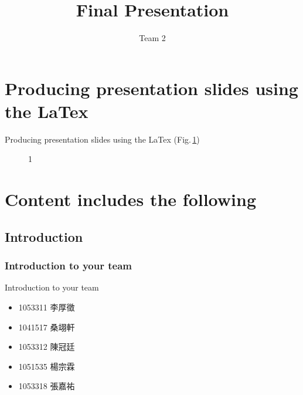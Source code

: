 \documentclass{beamer}
\title{Final Presentation}
\subtitle{Team 2}
\begin{document}
\begin{frame}
  \titlepage
\end{frame}

 \tableofcontents

\section{Producing presentation slides using the LaTex \medskip}
\begin{frame}{Producing presentation slides using the LaTex}
	(Fig.\,\ref{fig:1})
    \begin{figure}
    \caption{1}
    \label{fig:1}
  \end{figure}
\end{frame}


\section{Content includes the following }

\subsection{Introduction}

\subsubsection{Introduction to your team}
\begin{frame}{Introduction to your team}
\begin{itemize}
  \item  \begin{CJK}{UTF8}{bkai}1053311 李厚徵\end{CJK}
  \item  \begin{CJK}{UTF8}{bkai}1041517 桑翊軒\end{CJK}
  \item \begin{CJK}{UTF8}{bkai}1053312 陳冠廷\end{CJK}
  \item  \begin{CJK}{UTF8}{bkai}1051535 楊宗霖\end{CJK}
  \item  \begin{CJK}{UTF8}{bkai}1053318 張嘉祐\end{CJK}
\end{itemize}
\end{frame}
\end{document}
